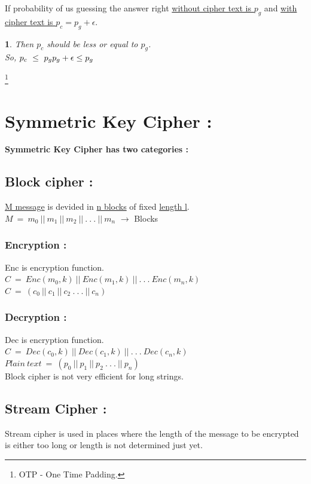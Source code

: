 \documentclass[11pt]{article}
\newtheorem{th}{}
\begin{document}
If probability of us guessing the answer right \underline{without cipher text is $p_g$} and \underline{with cipher text is $p_c = p_g+\epsilon$}.
\begin{th}
Then $p_c$ should be less or equal to $p_g$.\\
So,
$p_c\ \le \ p_g\\
p_g+\epsilon \le p_g $
\end{th}

 \footnote{OTP - One Time Padding.}
\newpage


\section{Symmetric Key Cipher :}
\textbf{Symmetric Key Cipher has two categories :}

\subsection{Block cipher :}
\underline{M message} is devided in \underline{n blocks} of fixed \underline{length l}.\\

$M\ =\ m_0\ ||\ m_1\ ||\ m_2\ ||\ .\ .\ .\ ||\ m_n$ $\rightarrow$ Blocks

\subsubsection[*]{Encryption :}
Enc is encryption function.\\

$C\ =\ Enc(m_0,k)\ ||\ Enc(m_1,k)\ ||\ .\ .\ .\ Enc(m_n,k)$\\

$C\ =\ (c_0\ ||\ c_1\ ||\ c_2\ .\ .\ .\ ||\ c_n)$\\

\subsubsection[*]{Decryption :}
Dec is encryption function.\\

$C\ =\ Dec(c_0,k)\ ||\ Dec(c_1,k)\ ||\ .\ .\ .\ Dec(c_n,k)$\\

$Plain\ text\ =\ (p_0\ ||\ p_1\ ||\ p_2\ .\ .\ .\ ||\ p_n)$\\

Block cipher is not very efficient for long strings.
\subsection{Stream Cipher :}
Stream cipher is used in places where the length of the message to be encrypted is either too long or length is not determined just yet.\\
\end{document}

